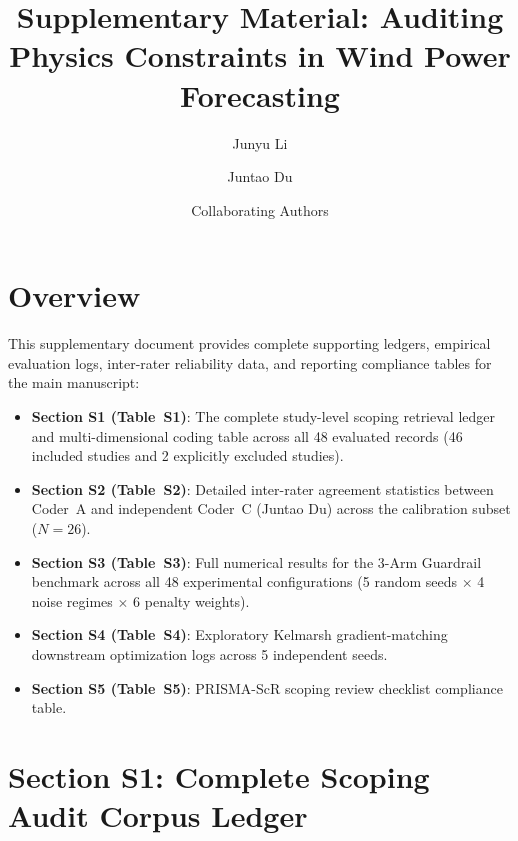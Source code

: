 \documentclass[3p,times]{elsarticle}
\begin{document}
\begin{frontmatter}
\title{Supplementary Material: Auditing Physics Constraints in Wind Power Forecasting}
\author[1]{Junyu Li}
\author[2]{Juntao Du}
\author[1]{Collaborating Authors}
\address[1]{School of Electrical and Information Engineering, China}
\address[2]{Independent Empirical Audit Group, China}
\end{frontmatter}

\section*{Overview}
This supplementary document provides complete supporting ledgers, empirical evaluation logs, inter-rater reliability data, and reporting compliance tables for the main manuscript:
\begin{itemize}
    \item \textbf{Section S1 (Table~S1)}: The complete study-level scoping retrieval ledger and multi-dimensional coding table across all 48 evaluated records (46 included studies and 2 explicitly excluded studies).
    \item \textbf{Section S2 (Table~S2)}: Detailed inter-rater agreement statistics between Coder~A and independent Coder~C (Juntao Du) across the calibration subset ($N=26$).
    \item \textbf{Section S3 (Table~S3)}: Full numerical results for the 3-Arm Guardrail benchmark across all 48 experimental configurations (5 random seeds $\times$ 4 noise regimes $\times$ 6 penalty weights).
    \item \textbf{Section S4 (Table~S4)}: Exploratory Kelmarsh gradient-matching downstream optimization logs across 5 independent seeds.
    \item \textbf{Section S5 (Table~S5)}: PRISMA-ScR scoping review checklist compliance table.
\end{itemize}

\newpage
\section*{Section S1: Complete Scoping Audit Corpus Ledger}
\end{document}
